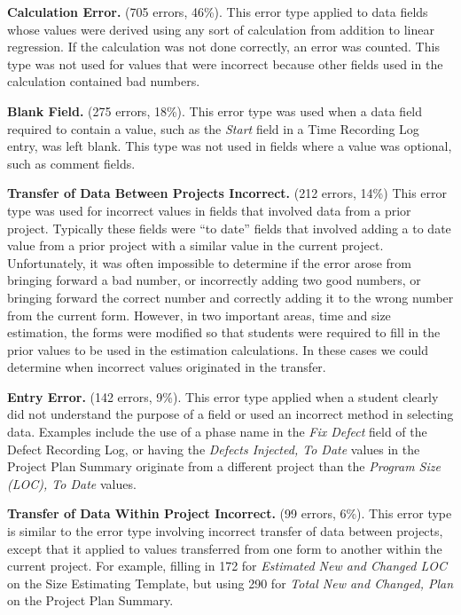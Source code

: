 {\bf Calculation Error.} (705 errors, 46\%). This error type applied
to data fields whose values were derived using any sort of calculation from
addition to linear regression.  If the calculation was not done correctly,
an error was counted.  This type was not used for values that were
incorrect because other fields used in the calculation contained bad
numbers.
        
{\bf Blank Field.} (275 errors, 18\%). This error type was used when a data field
required to contain a value, such as the {\it Start} field in a Time
Recording Log entry, was left blank.  This type was not used in fields
where a value was optional, such as comment fields.
        
{\bf Transfer of Data Between Projects Incorrect.} (212 errors, 14\%) This
error type was used for incorrect values in fields that involved data from
a prior project.  Typically these fields were ``to date'' fields that
involved adding a to date value from a prior project with a similar value
in the current project.  Unfortunately, it was often impossible to
determine if the error arose from bringing forward a bad number,
or incorrectly adding two good numbers, or bringing forward the correct number
and correctly adding it to the wrong number from the current form.
However, in two important areas, time and size estimation, the forms were
modified so that students were required to fill in the prior values to be
used in the estimation calculations. In these cases we could determine
when incorrect values originated in the transfer.
        
{\bf Entry Error.} (142 errors, 9\%). This error type applied when a
student clearly did not understand the purpose of a field or used an
incorrect method in selecting data.  Examples include the use of a phase
name in the {\it Fix Defect} field of the Defect Recording Log, or having
the {\it Defects Injected, To Date} values in the Project Plan Summary
originate from a different project than the {\it Program Size (LOC), To
  Date} values.
      
{\bf Transfer of Data Within Project Incorrect.} (99 errors, 6\%). This
error type is similar to the error type involving incorrect transfer of
data between projects, except that it applied to values transferred from
one form to another within the current project.  For example, filling in
172 for {\it Estimated New and Changed LOC} on the Size Estimating
Template, but using 290 for {\it Total New and Changed, Plan} on the
Project Plan Summary.
    

